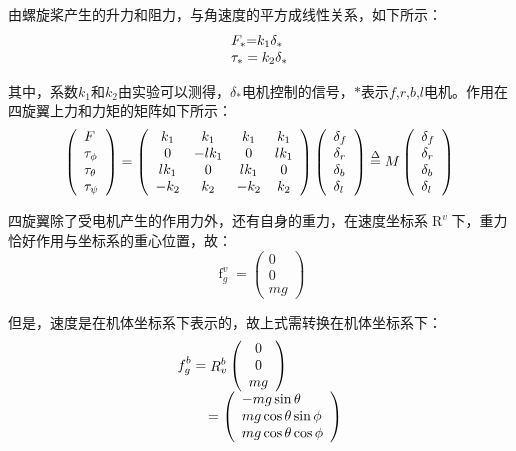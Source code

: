 由螺旋桨产生的升力和阻力，与角速度的平方成线性关系，如下所示：
\[\begin{array}{l}
{F_ * }{\rm{  = }}{k_1}{\delta _ * }\\
{\tau _ * } = {k_2}{\delta _ * }
\end{array}\]

其中，系数${k_1}$和${k_2}$由实验可以测得，${\delta _ * }$电机控制的信号，$ * $表示$f$,$r$,$b$,$l$电机。作用在四旋翼上力和力矩的矩阵如下所示：
\[\left( \begin{array}{l}
F\\
{\tau _\phi }\\
{\tau _\theta }\\
{\tau _\psi }
\end{array} \right) = \left( {\begin{array}{*{20}{c}}
{{k_1}}&{{k_1}}&{{k_1}}&{{k_1}}\\
0&{ - l{k_1}}&0&{l{k_1}}\\
{l{k_1}}&0&{l{k_1}}&0\\
{ - {k_2}}&{{k_2}}&{ - {k_2}}&{{k_2}}
\end{array}} \right)\left( \begin{array}{l}
{\delta _f}\\
{\delta _r}\\
{\delta _b}\\
{\delta _l}
\end{array} \right) \buildrel \Delta \over = M\left( \begin{array}{l}
{\delta _f}\\
{\delta _r}\\
{\delta _b}\\
{\delta _l}
\end{array} \right)\]

四旋翼除了受电机产生的作用力外，还有自身的重力，在速度坐标系$\mathop R\nolimits^v $下，重力恰好作用与坐标系的重心位置，故：
\[\mathop f\nolimits_g^v  = \left( \begin{array}{c}
0\\
0\\
mg
\end{array} \right)\]

但是，速度是在机体坐标系下表示的，故上式需转换在机体坐标系下：
\[\begin{array}{l}
\mathop f\nolimits_g^b  = \mathop R\nolimits_v^b \left( \begin{array}{c}
0\\
0\\
mg
\end{array} \right)\\
{\kern 1pt} {\kern 1pt} {\kern 1pt} {\kern 1pt} {\kern 1pt} {\kern 1pt} {\kern 1pt} {\kern 1pt} {\kern 1pt} {\kern 1pt} {\kern 1pt} {\kern 1pt} {\kern 1pt} {\kern 1pt} {\kern 1pt} {\kern 1pt} {\kern 1pt} {\kern 1pt} {\kern 1pt}  = \left( \begin{array}{l}
 - mg\sin \theta \\
mg\cos \theta \sin \phi \\
mg\cos \theta \cos \phi
\end{array} \right)
\end{array}\]

